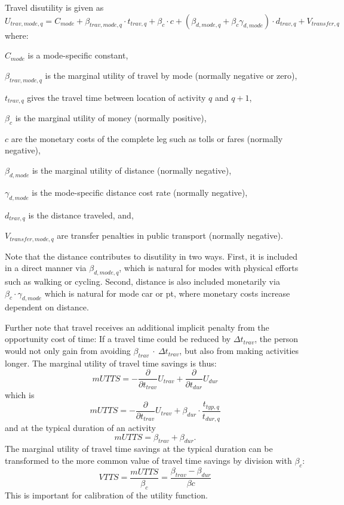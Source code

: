 %
Travel disutility is given as 
\begin{equation}
\label{eq:tdisutility}
U_{trav, mode, q} = C_{mode} + \beta_{trav, mode, q} \cdot t_{trav, q} + \beta_{c} \cdot c  + (\beta_{d, mode, q} + \beta_{c} \gamma_{d, mode}) \cdot d_{trav,q} + V_{transfer,q} \,
\end{equation} 
where:
\begin{compactitem} 
\item $C_{mode}$ is a mode-specific constant,
\item $\beta_{trav, mode, q}$ is the marginal utility of travel by mode (normally negative or zero),
\item $t_{trav, q}$ gives the travel time between location of activity $q$ and $q+1$,
\item $\beta_{c}$ is the marginal utility of money (normally positive),
\item $c$ are the monetary costs of the complete leg such as tolls or fares (normally negative),
\item $\beta_{d, mode}$ is the  marginal utility of distance (normally negative),
\item $\gamma_{d, mode}$ is the mode-specific distance cost rate (normally negative),
\item $d_{trav, q}$ is the distance traveled, and,
\item $V_{transfer, mode, q}$ are transfer penalties in public transport (normally negative).
\end{compactitem}
%
Note that the distance contributes to disutility in two ways. First, it is included in a direct manner via $\beta_{d, mode,q}$, which is natural for modes with physical efforts such as walking or cycling. Second, distance is also included monetarily via $\beta_c \cdot \gamma_{d, mode}$ which is natural for mode car or pt, where monetary costs increase dependent on distance.

Further note that travel receives an additional implicit penalty from the opportunity cost of time: If a travel time could be reduced by $\Delta t_{trav}$, the person would not only gain from avoiding $\beta_{trav}~\cdot~\Delta t_{trav}$, but also from making activities longer. The marginal utility of travel time savings is thus:
%
\[
mUTTS = - \frac{\partial}{\partial t_{trav}} U_{trav} + \frac{\partial}{\partial t_{dur}}U_{dur} 
\]
which is 
\[
mUTTS = - \frac{\partial}{\partial t_{trav}} U_{trav} +  \beta_{dur} \cdot \frac{t_{typ,q}}{t_{dur,q}} 
\]
and at the typical duration of an activity
\[
mUTTS = \beta_{trav} + \beta_{dur}.
\]
The marginal utility of travel time savings at the typical duration can be transformed to the more common value of travel time savings by division with $\beta_{c}$:
\[
VTTS = \frac{mUTTS}{\beta_{c}} = \frac{\beta_{trav} - \beta_{dur}}{\beta{c}}
\]
This is important for calibration of the utility function.

